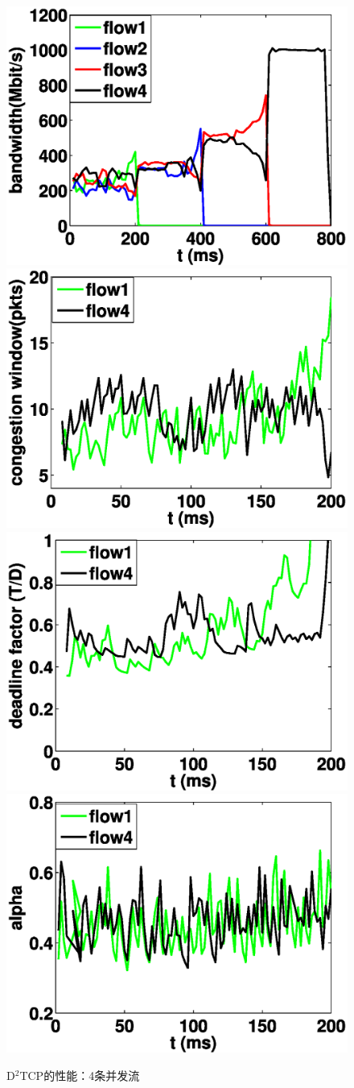 \begin{figure}[h]
  \centering%
    {\includegraphics[width=0.5\columnwidth]{figures/LPD/bandwidth.eps}}%
      {\includegraphics[width=0.5\columnwidth]{figures/LPD/cwnd.eps}}
    {\includegraphics[width=0.5\columnwidth]{figures/LPD/deadlinefactor.eps}}%
      {\includegraphics[width=0.5\columnwidth]{figures/LPD/alpha.eps}}
  \caption{D$^2$TCP的性能：4条并发流}
  \label{LPD_Motivation}
\end{figure}

